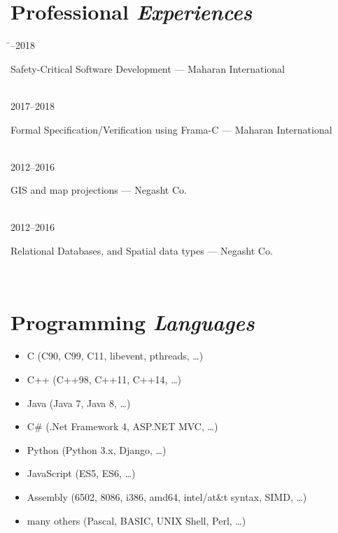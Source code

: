 \documentclass[a4paper,10pt]{article}
\newcommand{\follownote}[1]{--- {\footnotesize\color{darkblue}#1}}
\begin{document}
\section*{{\color{green}Professional \emph{Experiences}}}
\begin{tabbing}
\hspace{2.5cm}\=--2018 \>\parbox[t]{10.5cm}{
	Safety-Critical Software Development
	\follownote{Maharan International}
} \\[2mm]
2017--2018 \>\parbox[t]{10.5cm}{
	Formal Specification/Verification using Frama-C
	\follownote{Maharan International}
} \\[2mm]
2012--2016 \>\parbox[t]{10.5cm}{
	GIS and map projections
	\follownote{Negasht Co.}
} \\[2mm]
2012--2016 \>\parbox[t]{10.5cm}{
	Relational Databases, and Spatial data types
	\follownote{Negasht Co.}
} \\[2mm]
\end{tabbing}

\section*{{\color{purple}Programming \emph{Languages}}}
\begin{itemize}
	\item C (C90, C99, C11, libevent, pthreads, \ldots)
	\item C++ (C++98, C++11, C++14, \ldots)
	\item Java (Java 7, Java 8, \ldots)
	\item C\# (.Net Framework 4, ASP.NET MVC, \ldots)
	\item Python (Python 3.x, Django, \ldots)
	\item JavaScript (ES5, ES6, \ldots)
	\item Assembly (6502, 8086, i386, amd64, intel/at\&t syntax,
	    SIMD, \ldots)
	\item many others (Pascal, BASIC, UNIX Shell, Perl, \ldots)
\end{itemize}
\end{document}
